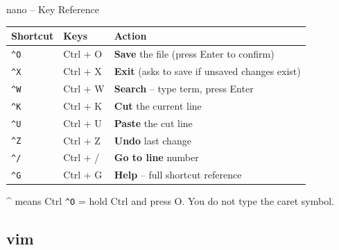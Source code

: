\documentclass[aspectratio=169]{beamer}
\begin{document}
\begin{frame}{nano -- Key Reference}
  \begin{table}
    \begin{tabularx}{\textwidth}{llX}
      \textbf{Shortcut} & \textbf{Keys} & \textbf{Action} \\
      \toprule
      \texttt{\textasciicircum{}O} & Ctrl + O
        & \textbf{Save} the file (press Enter to confirm) \\
      \texttt{\textasciicircum{}X} & Ctrl + X
        & \textbf{Exit} (asks to save if unsaved changes exist) \\
      \texttt{\textasciicircum{}W} & Ctrl + W
        & \textbf{Search} -- type term, press Enter \\
      \texttt{\textasciicircum{}K} & Ctrl + K
        & \textbf{Cut} the current line \\
      \texttt{\textasciicircum{}U} & Ctrl + U
        & \textbf{Paste} the cut line \\
      \texttt{\textasciicircum{}Z} & Ctrl + Z
        & \textbf{Undo} last change \\
      \texttt{\textasciicircum{}/} & Ctrl + /
        & \textbf{Go to line} number \\
      \texttt{\textasciicircum{}G} & Ctrl + G
        & \textbf{Help} -- full shortcut reference \\
      \bottomrule
    \end{tabularx}
  \end{table}
  \vspace{0.3em}
  \begin{exampleblock}{\textasciicircum{} means Ctrl}
    \texttt{\textasciicircum{}O} = hold Ctrl and press O.
    You do not type the caret symbol.
  \end{exampleblock}
\end{frame}

\subsection{vim}
\end{document}
